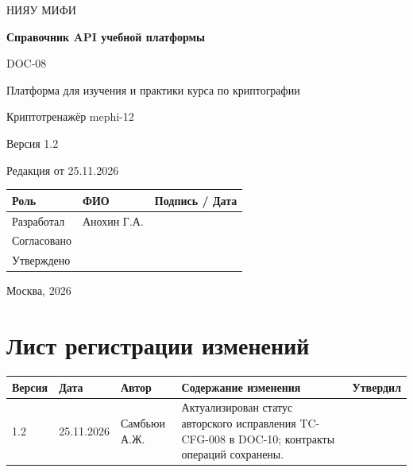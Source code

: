 \documentclass[12pt,a4paper]{article}
\begin{document}
\hypersetup{pageanchor=false}
\begin{titlepage}
  \thispagestyle{empty}
  \centering
  {\large НИЯУ МИФИ\par}
  \vspace*{3.5cm}
  {\LARGE\bfseries Справочник API учебной платформы\par}
  \vspace{0.5cm}
  {\large DOC-08\par}
  \vspace{0.6cm}
  {\large Платформа для изучения и практики курса по криптографии\par}
  {\large Криптотренажёр mephi-12\par}
  \vspace{0.7cm}
  {\large Версия 1.2\par}
  {\large Редакция от 25.11.2026\par}
  \vspace{1cm}
  \begin{tabularx}{\textwidth}{@{}p{3.4cm}Xp{4cm}@{}}
    \toprule
    Роль & ФИО & Подпись / Дата \\
    \midrule
    Разработал & Анохин Г.А. & \\
    \addlinespace[6pt]
    Согласовано & & \\
    \addlinespace[6pt]
    Утверждено & & \\
    \bottomrule
  \end{tabularx}
  \vfill
  {\large Москва, 2026\par}
\end{titlepage}
\hypersetup{pageanchor=true}

\section*{Лист регистрации изменений}
\begingroup\small\singlespacing
\noindent
\begin{tabularx}{\textwidth}{@{}p{1.2cm}p{2cm}p{2.5cm}Xp{1.8cm}@{}}
\toprule
Версия & Дата & Автор & Содержание изменения & Утвердил \\
\midrule
1.2 & 25.11.2026 & Самбьюи А.Ж. & Актуализирован статус авторского исправления TC-CFG-008 в DOC-10; контракты операций сохранены. & \\
\bottomrule
\end{tabularx}
\endgroup
\clearpage
\begingroup\small\singlespacing
\tableofcontents
\endgroup
\clearpage

\hypertarget{doc-08-справочник-api-платформы}{}
\end{document}
